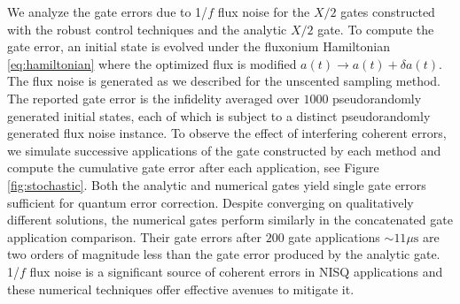 We analyze the gate errors due to 1/$f$ flux noise for
the $X/2$ gates constructed with the robust control techniques
and the analytic $X/2$ gate. To compute the gate error,
an initial state is evolved
under the fluxonium Hamiltonian \eqref{eq:hamiltonian}
where the optimized flux is modified $a(t) \rightarrow a(t) + \delta a(t)$.
The flux noise is generated as
we described for the unscented sampling method.
The reported gate error is the infidelity
averaged over $1000$ pseudorandomly generated initial states,
each of which is subject to a distinct pseudorandomly
generated flux noise instance.
To observe the effect of interfering coherent errors,
we simulate successive applications of the gate constructed by each method
and compute the cumulative gate error
after each application, see Figure \ref{fig:stochastic}.
Both the analytic
and numerical gates yield single gate errors
sufficient for quantum error correction.
Despite converging on qualitatively different solutions, the
numerical gates perform similarly in the concatenated
gate application comparison. Their gate errors
after $200$ gate applications $\sim 11 \mu\textrm{s}$ are
two orders of magnitude less than the gate error produced by the analytic gate.
1/$f$ flux noise is a significant source of coherent errors in NISQ applications and
these numerical techniques offer effective avenues to mitigate it.
